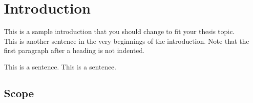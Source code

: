 %
%
%
%
%


\chapter{Introduction}

This is a sample introduction that you should change to fit your thesis topic.
This is another sentence in the very beginnings of the introduction.
Note that the first paragraph after a heading is not indented.

This is a sentence.
This is a sentence.

\section{Scope}

